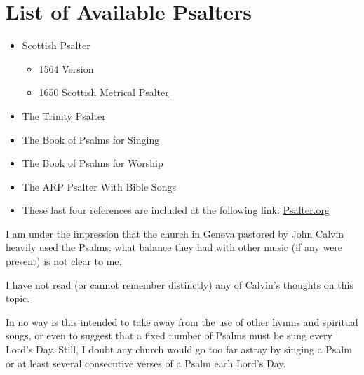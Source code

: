 \documentclass{article}
\begin{document}
\section{List of Available Psalters}


\begin{itemize}

	\item Scottish Psalter
		\begin{itemize}
			\item 1564 Version
			\item \href{https://thewestminsterstandard.org/1650-scottish-metrical-psalter/}{1650 Scottish Metrical Psalter}
		\end{itemize}
	\item The Trinity Psalter
	\item The Book of Psalms for Singing
	\item The Book of Psalms for Worship
	\item The ARP Psalter With Bible Songs
	\item These last four references are included at the following link:
		\href{www.psalter.org}{Psalter.org} 
\end{itemize}



I am under the impression that the church in Geneva pastored by John Calvin heavily used the Psalms; what balance they had with other music (if any were present) is not clear to me.

I have not read (or cannot remember distinctly) any of Calvin's thoughts on this topic.

In no way is this intended to take away from the use of other hymns and spiritual songs, or even to suggest that a fixed number of Psalms must be sung every Lord's Day.  Still, I doubt any church would go too far astray by singing a Psalm or at least several consecutive verses of a Psalm each Lord's Day.
\end{document}
